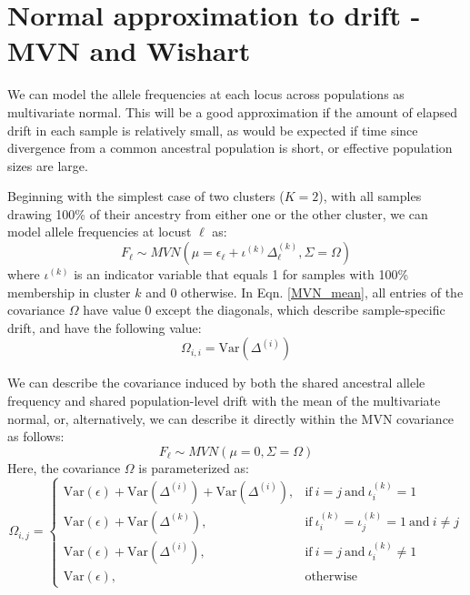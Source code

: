 \documentclass[12pt]{article}
\begin{document}
\section{Normal approximation to drift - MVN and Wishart}
We can model the allele frequencies at each locus across populations as multivariate normal.
This will be a good approximation if the amount of elapsed drift in each sample is relatively small,
as would be expected if time since divergence from a common ancestral population is short,
or effective population sizes are large.

Beginning with the simplest case of two clusters ($K=2$),
with all samples drawing 100\% of their ancestry from either one or the other cluster, 
we can model allele frequencies at locust $\ell$ as:
%
\begin{equation}
F_{\ell} \sim MVN\left(\mu = \epsilon_{\ell} + \iota^{(k)}\Delta_{\ell}^{(k)}, \Sigma = \Omega	\right)
\label{MVN_mean}
\end{equation}
%
where $\iota^{(k)}$ is an indicator variable that equals 1 for samples with 100\% membership in cluster $k$
and 0 otherwise.
In Eqn. \eqref{MVN_mean}, all entries of the covariance $\Omega$ have value 0 except the diagonals,
which describe sample-specific drift, and have the following value:
%
\begin{equation}
\Omega_{i,i} = \text{Var}\left( \Delta^{(i)} \right)
\label{MVN_mean_diag}
\end{equation}

We can describe the covariance induced by both 
the shared ancestral allele frequency and shared population-level drift
with the mean of the multivariate normal,
or, alternatively, we can describe it directly within the MVN covariance as follows:
\begin{equation}
F_{\ell} \sim MVN\left(\mu = 0, \Sigma = \Omega	\right)
\label{MVN_covar}
\end{equation}
%
Here, the covariance $\Omega$ is parameterized as:
\begin{equation}
	\Omega_{i,j} = 
	\begin{cases}
	      \text{Var}(\epsilon) +  \text{Var}\left( \Delta^{(i)} \right) + \text{Var}\left( \Delta^{(i)} \right), & \text{if}\ i=j\ \text{and}\ \iota^{(k)}_i = 1 \\
      	      \text{Var}(\epsilon) +  \text{Var}\left( \Delta^{(k)} \right), & \text{if}\ \iota^{(k)}_i = \iota^{(k)}_j = 1\ \text{and}\ i \neq j \\
	      \text{Var}(\epsilon) +  \text{Var}\left( \Delta^{(i)} \right), & \text{if}\ i=j\ \text{and}\ \iota^{(k)}_i \neq 1 \\
	      \text{Var}(\epsilon), & \text{otherwise}
	\end{cases}
\label{MVN_covar}
\end{equation}
\end{document}
